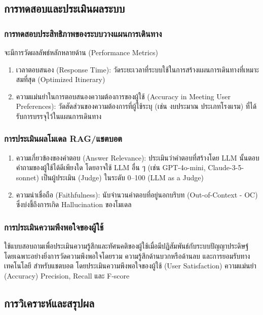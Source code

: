 \subsection{การทดสอบและประเมินผลระบบ}

\subsubsection{การทดสอบประสิทธิภาพของระบบวางแผนการเดินทาง}

จะมีการวัดผลลัพธ์หลักหลายด้าน (Performance Metrics)
\begin{enumerate}[leftmargin=1.8cm]
\item เวลาตอบสนอง (Response Time): วัดระยะเวลาที่ระบบใช้ในการสร้างแผนการเดินทางที่เหมาะสมที่สุด (Optimized Itinerary)
\item ความแม่นยำในการตอบสนองความต้องการของผู้ใช้ (Accuracy in Meeting User Preferences): วัดสัดส่วนของความต้องการที่ผู้ใช้ระบุ (เช่น งบประมาณ ประเภทโรงแรม) ที่ได้รับการบรรจุไว้ในแผนการเดินทาง
\end{enumerate}

\subsubsection{การประเมินผลโมเดล RAG/แชตบอต}

\begin{enumerate}[leftmargin=1.8cm]
\item ความเกี่ยวข้องของคำตอบ (Answer Relevance): ประเมินว่าคำตอบที่สร้างโดย LLM นั้นตอบคำถามของผู้ใช้ได้ดีเพียงใด โดยอาจใช้ LLM อื่น ๆ (เช่น GPT-4o-mini, Claude-3-5-sonnet) เป็นผู้ประเมิน (Judge) ในระดับ 0--100 (LLM as a Judge)
\item ความน่าเชื่อถือ (Faithfulness): นับจำนวนคำตอบที่อยู่นอกบริบท (Out-of-Context - OC) ซึ่งบ่งชี้ถึงการเกิด Hallucination ของโมเดล
\end{enumerate}

\subsubsection{การประเมินความพึงพอใจของผู้ใช้}

ใช้แบบสอบถามเพื่อประเมินความรู้สึกและทัศนคติของผู้ใช้เมื่อมีปฏิสัมพันธ์กับระบบปัญญาประดิษฐ์ โดยเฉพาะอย่างยิ่งการวัดความพึงพอใจโดยรวม ความรู้สึกด้านบวกหรือด้านลบ และการยอมรับทางเทคโนโลยี สำหรับแชตบอต โดยประเมินความพึงพอใจของผู้ใช้ (User Satisfaction) ความแม่นยำ (Accuracy) Precision, Recall และ F-score

\subsection{การวิเคราะห์และสรุปผล}

